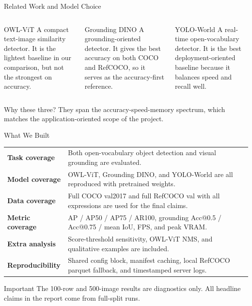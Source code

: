 \documentclass[aspectratio=169,professionalfonts]{beamer}
\begin{document}
\begin{frame}{Related Work and Model Choice}
  \begin{columns}[T,onlytextwidth]
    \begin{block}{OWL-ViT}
      \small
      A compact text-image similarity detector. It is the lightest baseline in our comparison, but not the strongest on accuracy.
    \end{block}

    \begin{block}{Grounding DINO}
      \small
      A grounding-oriented detector. It gives the best accuracy on both COCO and RefCOCO, so it serves as the accuracy-first reference.
    \end{block}

    \begin{block}{YOLO-World}
      \small
      A real-time open-vocabulary detector. It is the best deployment-oriented baseline because it balances speed and recall well.
    \end{block}
  \end{columns}

  \vspace{0.35em}
  \begin{alertblock}{Why these three?}
    They span the accuracy-speed-memory spectrum, which matches the application-oriented scope of the project.
  \end{alertblock}
\end{frame}

\begin{frame}{What We Built}
  \small
  \begin{tabularx}{\textwidth}{>{\bfseries}p{3.35cm}Y}
    Task coverage & Both open-vocabulary object detection and visual grounding are evaluated. \\
    Model coverage & OWL-ViT, Grounding DINO, and YOLO-World are all reproduced with pretrained weights. \\
    Data coverage & Full COCO val2017 and full RefCOCO val with all expressions are used for the final claims. \\
    Metric coverage & AP / AP50 / AP75 / AR100, grounding Acc@0.5 / Acc@0.75 / mean IoU, FPS, and peak VRAM. \\
    Extra analysis & Score-threshold sensitivity, OWL-ViT NMS, and qualitative examples are included. \\
    Reproducibility & Shared config block, manifest caching, local RefCOCO parquet fallback, and timestamped server logs. \\
  \end{tabularx}

  \vspace{0.5em}
  \begin{alertblock}{Important}
    The 100-row and 500-image results are diagnostics only. All headline claims in the report come from full-split runs.
  \end{alertblock}
\end{frame}
\end{document}
